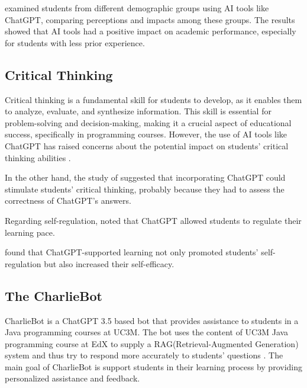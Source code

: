\documentclass[conference]{IEEEtran}
\begin{document}
examined students from different demographic groups
using AI tools like ChatGPT, comparing perceptions and impacts
among these groups. The results showed that AI tools had a positive impact on
academic performance, especially for students with less prior experience.

\subsection{Critical Thinking}

Critical thinking is a fundamental skill for students to develop, as it enables
them to analyze, evaluate, and synthesize information. This skill is essential
for problem-solving and decision-making, making it a crucial aspect of
educational success, specifically in programming courses. However, the use of AI
tools like ChatGPT has raised concerns about the potential impact on students'
critical thinking abilities \cite{Murillo23} \cite{cai23} \cite{chan23}.

In the other hand, the study of \cite{zhang24} suggested that incorporating
ChatGPT could stimulate students' critical thinking, probably because they
had to assess the correctness of ChatGPT's answers.

Regarding self-regulation, \cite{cai23} noted that ChatGPT allowed students to
regulate their learning pace.

\cite{wu24} found that ChatGPT-supported learning not only promoted students'
self-regulation but also increased their self-efficacy.

\subsection{The CharlieBot}

CharlieBot is a ChatGPT 3.5 based bot that provides assistance to students in a
Java programming courses at UC3M. The bot uses the content of UC3M Java
programming course at EdX to supply a RAG(Retrieval-Augmented Generation) system
and thus try to respond more accurately to students' questions \cite{Sun24}.
The main goal of CharlieBot is support students in their learning process by
providing personalized assistance and feedback.
\end{document}
